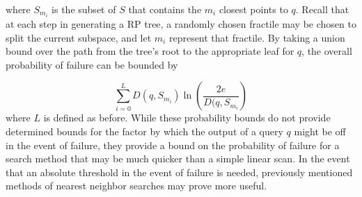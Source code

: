 where $S_{m_i}$ is the subset of $S$ that contains the $m_i$ closest points to $q$. Recall that at each step in generating a RP tree, a randomly chosen fractile may be chosen to split the current subspace, and let $m_i$ represent that fractile. By taking a union bound over the path from the tree's root to the appropriate leaf for $q$, the overall probability of failure can be bounded by

$$\sum_{i=0}^{L}D(q,S_{m_i})\ln\left(\frac{2e}{D(q,S_{m_i}}\right)$$
\noindent
where $L$ is defined as before.
\newline
\indent
While these probability bounds do not provide determined bounds for the factor by which the output of a query $q$ might be off in the event of failure, they provide a bound on the probability of failure for a search method that may be much quicker than a simple linear scan. In the event that an absolute threshold in the event of failure is needed, previously mentioned methods of nearest neighbor searches may prove more useful.


